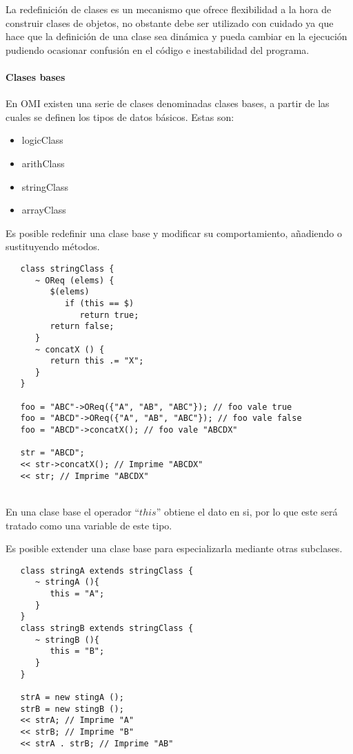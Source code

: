 La redefinición de clases es un mecanismo que ofrece flexibilidad a la hora de construir clases de objetos, no obstante 
debe ser utilizado con cuidado ya que hace que la definición de una clase sea dinámica y pueda cambiar en la ejecución 
pudiendo ocasionar confusión en el código e inestabilidad del programa.

\paragraph{Clases bases}
En OMI existen una serie de clases denominadas clases bases, a partir de las 
cuales se definen los tipos de datos básicos. Estas son:

\begin{itemize}
\item logicClass
\item arithClass
\item stringClass
\item arrayClass
\end{itemize}

Es posible redefinir una clase base y modificar su comportamiento, añadiendo o sustituyendo 
métodos. \\

\begin{lstlisting}
   class stringClass {
      ~ OReq (elems) {
         $(elems)
            if (this == $) 
               return true;
         return false;
      }
      ~ concatX () {
         return this .= "X";
      }
   }

   foo = "ABC"->OReq({"A", "AB", "ABC"}); // foo vale true
   foo = "ABCD"->OReq({"A", "AB", "ABC"}); // foo vale false
   foo = "ABCD"->concatX(); // foo vale "ABCDX"
   
   str = "ABCD";
   << str->concatX(); // Imprime "ABCDX"
   << str; // Imprime "ABCDX"
\end{lstlisting}
\hfill\\ 

 En una clase base el operador ``$this$'' obtiene el dato en si, por lo que este será tratado como una variable
 de este tipo.
 
 Es posible extender una clase base para especializarla mediante otras subclases. \\
 
 \begin{lstlisting}
   class stringA extends stringClass {
      ~ stringA (){
         this = "A";
      }
   }
   class stringB extends stringClass {
      ~ stringB (){
         this = "B";
      }
   }

   strA = new stingA ();
   strB = new stingB ();
   << strA; // Imprime "A"
   << strB; // Imprime "B"
   << strA . strB; // Imprime "AB"
\end{lstlisting}
\hfill\\ 

